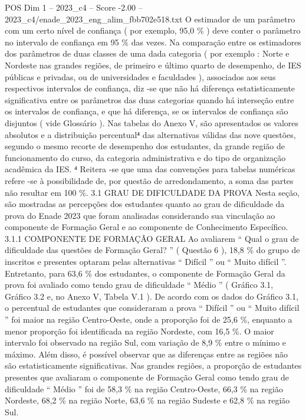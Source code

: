 \begin{textsample}{POS Dim 1 – 2023\_c4 – Score -2.00 – 2023\_c4/enade\_2023\_eng\_alim\_fbb702e518.txt}
O estimador de um parâmetro com um certo nível de confiança ( por exemplo, 95,0 \% ) deve conter o parâmetro no intervalo de confiança em 95 \% das vezes.
Na comparação entre os estimadores dos parâmetros de duas classes de uma dada categoria ( por exemplo : Norte e Nordeste nas grandes regiões, de primeiro e último quarto de desempenho, de IES públicas e privadas, ou de universidades e faculdades ), associados aos seus respectivos intervalos de confiança, diz -se que não há diferença estatisticamente significativa entre os parâmetros das duas categorias quando há interseção entre os intervalos de confiança, e que há diferença, se os intervalos de confiança são disjuntos ( vide Glossário ).
Nas tabelas do Anexo V, são apresentados os valores absolutos e a distribuição percentual⁴ das alternativas válidas das nove questões, segundo o mesmo recorte de desempenho dos estudantes, da grande região de funcionamento do curso, da categoria administrativa e do tipo de organização acadêmica da IES. ⁴ Reitera -se que uma das convenções para tabelas numéricas refere -se à possibilidade de, por questão de arredondamento, a soma das partes não resultar em 100 \%. 3.1 GRAU DE DIFICULDADE DA PROVA Nesta seção, são mostradas as percepções dos estudantes quanto ao grau de dificuldade da prova do Enade 2023 que foram analisadas considerando sua vinculação ao componente de Formação Geral e ao componente de Conhecimento Específico. 3.1.1 COMPONENTE DE FORMAÇÃO GERAL Ao avaliarem “ Qual o grau de dificuldade das questões de Formação Geral? ” ( Questão 6 ), 18,8 \% do grupo de inscritos e presentes optaram pelas alternativas “ Difícil ” ou “ Muito difícil ”.
Entretanto, para 63,6 \% dos estudantes, o componente de Formação Geral da prova foi avaliado como tendo grau de dificuldade “ Médio ” ( Gráfico 3.1, Gráfico 3.2 e, no Anexo V, Tabela V.1 ).
De acordo com os dados do Gráfico 3.1, o percentual de estudantes que consideraram a prova “ Difícil ” ou “ Muito difícil ” foi maior na região Centro-Oeste, onde a proporção foi de 25,6 \%, enquanto a menor proporção foi identificada na região Nordeste, com 16,5 \%.
O maior intervalo foi observado na região Sul, com variação de 8,9 \% entre o mínimo e máximo.
Além disso, é possível observar que as diferenças entre as regiões não são estatisticamente significativas.
Nas grandes regiões, a proporção de estudantes presentes que avaliaram o componente de Formação Geral como tendo grau de dificuldade “ Médio ” foi de 58,3 \% na região Centro-Oeste, 66,3 \% na região Nordeste, 68,2 \% na região Norte, 63,6 \% na região Sudeste e 62,8 \% na região Sul.

\end{textsample}
